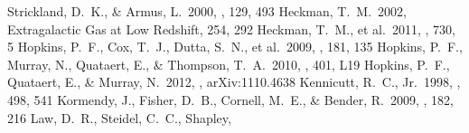 \documentclass[apj]{emulateapj}
\begin{document}
\begin{thebibliography}{}
  Strickland, D.~K., \& Armus, L.\ 2000, \apjs, 129, 493
 Heckman, T.~M.\ 2002, Extragalactic Gas
  at Low Redshift, 254, 292
 Heckman, T.~M., et al.\ 2011,
  \apj, 730, 5
 Hopkins, P.~F., Cox, T.~J.,
  Dutta, S.~N., et al.\ 2009, \apjs, 181, 135
 Hopkins, P.~F., Murray, N.,
  Quataert, E., \& Thompson, T.~A.\ 2010, \mnras, 401, L19
 Hopkins, P.~F., Quataert, E., \&
  Murray, N.\ 2012, \mnras, arXiv:1110.4638
 Kennicutt, R.~C., Jr.\ 1998, \apj,
  498, 541
 Kormendy, J., Fisher, D.~B.,
  Cornell, M.~E., \& Bender, R.\ 2009, \apjs, 182, 216
 Law, D.~R., Steidel, C.~C., Shapley,

\end{thebibliography}
\end{document}

